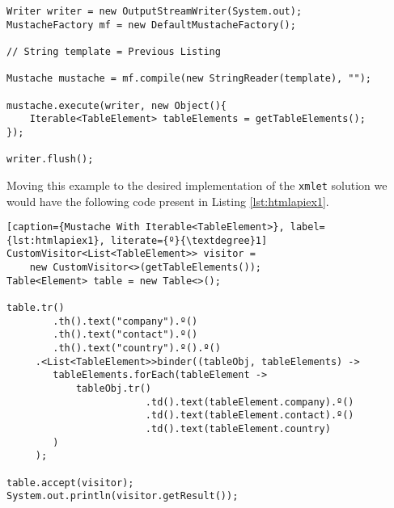 \bigskip


\begin{minipage}{\linewidth}
\begin{lstlisting}[caption={Mustache With Iterable<TableElement>}, label={lst:mustacheex1code}]
Writer writer = new OutputStreamWriter(System.out);
MustacheFactory mf = new DefaultMustacheFactory();

// String template = Previous Listing

Mustache mustache = mf.compile(new StringReader(template), "");

mustache.execute(writer, new Object(){
    Iterable<TableElement> tableElements = getTableElements();
});

writer.flush();
\end{lstlisting}
\end{minipage} 

\newpage

\noindent
Moving this example to the desired implementation of the \texttt{xmlet} solution we would have the following code present in Listing \ref{lst:htmlapiex1}.


\begin{minipage}{\linewidth}
\begin{lstlisting}[caption={Mustache With Iterable<TableElement>}, label={lst:htmlapiex1}, literate={º}{\textdegree}1]
CustomVisitor<List<TableElement>> visitor = 
    new CustomVisitor<>(getTableElements());
Table<Element> table = new Table<>();

table.tr()
        .th().text("company").º()
        .th().text("contact").º()
        .th().text("country").º().º()
     .<List<TableElement>>binder((tableObj, tableElements) ->
        tableElements.forEach(tableElement ->
            tableObj.tr()
                        .td().text(tableElement.company).º()
                        .td().text(tableElement.contact).º()
                        .td().text(tableElement.country)
        )
     );

table.accept(visitor);
System.out.println(visitor.getResult());
\end{lstlisting}
\end{minipage} 

